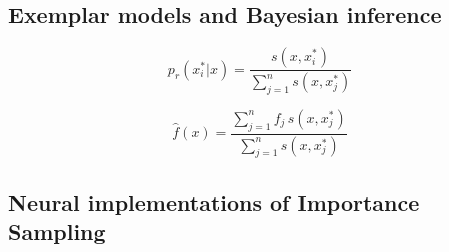 \documentclass[10pt,letterpaper]{article}
\begin{document}
\subsection{Exemplar models and Bayesian inference}





\begin{equation}
	p_{r}(x^{*}_{i}|x)=\frac{s(x,x^{*}_{i})}{\sum^{n}_{j=1}s(x,x^{*}_{j})}
\end{equation}

\cite{ashby1995categorization}


\begin{equation}
	\hat{f}(x)=\frac{\sum^{n}_{j=1}f_{j}\,s(x,x^{*}_{j})}{\sum^{n}_{j=1}s(x,x^{*}_{j})}
\end{equation}



\cite{neal1993probabilistic,Shi2010}

\subsection{Neural implementations of Importance Sampling}
\cite{Shi2009}

\end{document}
